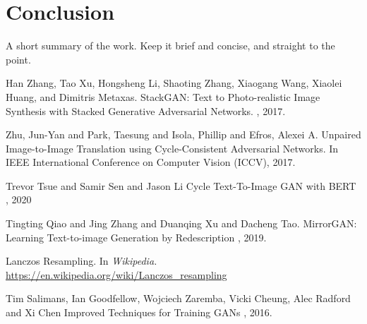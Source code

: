 \documentclass{article}
\begin{document}
	\section{Conclusion}

	    A short summary of the work. Keep it brief and concise, and straight to the point.


	  
	
	
	\begin{thebibliography}{1}
		Han Zhang, Tao Xu, Hongsheng Li, Shaoting Zhang, Xiaogang Wang, Xiaolei Huang, and 
		Dimitris Metaxas.
		\newblock StackGAN: Text to Photo-realistic Image Synthesis with Stacked 
		Generative Adversarial Networks.
		, 2017.
		

		Zhu, Jun-Yan and Park, Taesung and Isola, Phillip and Efros, Alexei A.
		\newblock Unpaired Image-to-Image Translation using Cycle-Consistent Adversarial Networks.
		\newblock In IEEE International Conference on Computer Vision (ICCV), 2017.

		Trevor Tsue and Samir Sen and Jason Li
		\newblock Cycle Text-To-Image GAN with BERT
		, 2020
		
		Tingting Qiao and Jing Zhang and Duanqing Xu and Dacheng Tao.
		\newblock MirrorGAN: Learning Text-to-image Generation by Redescription
		, 2019.

		Lanczos Resampling.
		\newblock In {\em Wikipedia.} \url{https://en.wikipedia.org/wiki/Lanczos_resampling}
		
		Tim Salimans, Ian Goodfellow, Wojciech Zaremba, Vicki Cheung, Alec Radford and Xi Chen
		\newblock Improved Techniques for Training GANs
		, 2016.

	\end{thebibliography}
	
	
\end{document}
